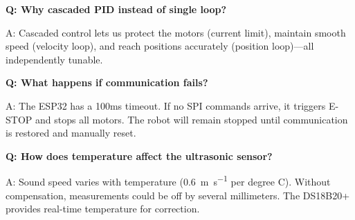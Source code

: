 \documentclass[11pt,letterpaper]{article}
\begin{document}
\vspace{0.3cm}

\textbf{Q: Why cascaded PID instead of single loop?}

A: Cascaded control lets us protect the motors (current limit), maintain smooth speed (velocity loop), and reach positions accurately (position loop)---all independently tunable.

\vspace{0.3cm}

\textbf{Q: What happens if communication fails?}

A: The ESP32 has a 100ms timeout. If no SPI commands arrive, it triggers E-STOP and stops all motors. The robot will remain stopped until communication is restored and manually reset.

\vspace{0.3cm}

\textbf{Q: How does temperature affect the ultrasonic sensor?}

A: Sound speed varies with temperature (\SI{0.6}{\meter\per\second} per degree C). Without compensation, measurements could be off by several millimeters. The DS18B20+ provides real-time temperature for correction.
\end{document}

